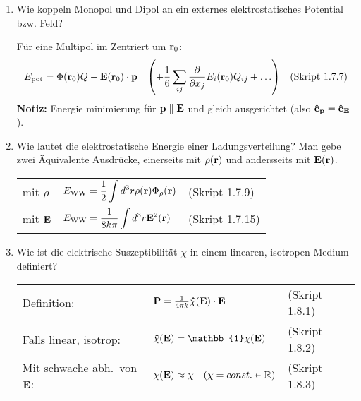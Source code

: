 \documentclass{scrartcl}
\newcommand{\ds}{\displaystyle}
\newcommand{\smref}[1]{\quad\text{(Skript #1)}}
\begin{document}
\begin{enumerate}
    \item Wie koppeln Monopol und Dipol an ein externes elektrostatisches
          Potential bzw. Feld?
          
          Für eine Multipol im Zentriert um $\vb r_0$:
          $$E_{\text{pot}}=\Phi(\vb r_0)Q-\vb E(\vb r_0)\cdot\vb p 
          \quad\qty(+ \frac{1}{6}\sum_{ij}\pdv{x_j}E_i(\vb r_0)Q_{ij}
          +\ldots)
          \smref{1.7.7}$$
          \textbf{Notiz:} Energie minimierung für $\vb p\parallel \vb E$
          und gleich ausgerichtet (also $\vu e_{\vb p}=\vu e_{\vb E}$).\\

    \item Wie lautet die elektrostatische Energie einer Ladungsverteilung?
          Man gebe zwei Äquivalente Ausdrücke, einerseits mit $\rho(\vb r)$
          und andersseits mit $\vb E(\vb r)$.
          \begin{center}
          \begin{tabular}{lll}
            mit $\rho$    & $\ds E_{\text{WW}}=
                            \frac{1}{2}\int d^3 r\rho(\vb r)
                            \Phi_\rho(\vb r)$
                              &(Skript 1.7.9)\\
            mit $\vb E$   & $\ds E_{\text{WW}}=\frac{1}{8k\pi}
                             \int d^3 r\vb E^2(\vb r)$
                              &(Skript 1.7.15)\\
          \end{tabular}
          \end{center}

    \clearpage
    \item Wie ist die elektrische Suszeptibilität $\chi$ in einem 
          linearen, isotropen Medium definiert?
          \begin{center}
          \begin{tabular}{lll}
            Definition:             
            & $\vb P = \frac{1}{4\pi k} 
              \vu \chi(\vb E)\cdot \vb E\quad$
            & (Skript 1.8.1) \\
            Falls linear, isotrop: 
            & $\vu\chi(\vb E)=
              \mathbb{1}\chi(\vb E)$
                & (Skript 1.8.2) \\
            Mit schwache abh.\ von $\vb E$:
                                    & $\chi(\vb E)\approx\chi
                                    \quad(\chi=const.\in\mathbb{R})$
                                      & (Skript 1.8.3) \\
            

\end{tabular}
\end{center}
\end{enumerate}
\end{document}
